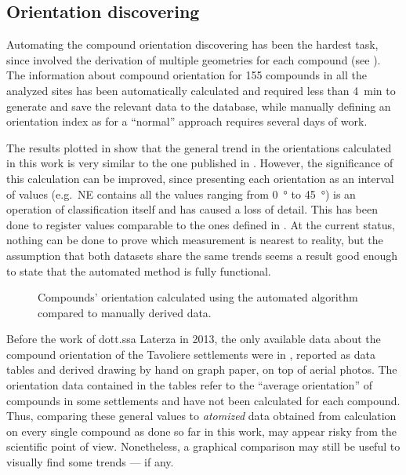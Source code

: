 
        \subsection{Orientation discovering}

            Automating the compound orientation discovering has been the hardest task, since involved the derivation of multiple geometries for each compound (see ).
            The information about compound orientation for 155 compounds in all the analyzed sites has been automatically calculated and required less than \SI{4}{\minute} to generate and save the relevant data to the database, while manually defining an orientation index as for a ``normal'' approach requires several days of work.
            
            The results plotted in  show that the general trend in the orientations calculated in this work is very similar to the one published in \cite{laterza}. However, the significance of this calculation can be improved, since presenting each orientation as an interval of values (e.g.\ NE contains all the values ranging from \SI{0}{\degree} to \SI{45}{\degree}) is an operation of classification itself and has caused a loss of detail. This has been done to register values comparable to the ones defined in \cite{laterza}. At the current status, nothing can be done to prove which measurement is nearest to reality, but the assumption that both datasets share the same trends seems a result good enough to state that the automated method is fully functional.

            \begin{figure}[H]
                \centering
                \begin{tikzpicture}
                    
                \end{tikzpicture}
                \caption[Orientation of compounds for all the settlements calculated in this work compared with know data.]{Compounds' orientation calculated using the automated algorithm compared to manually derived data.}
                \label{fig:graph-orient}
            \end{figure}

            Before the work of dott.ssa Laterza in 2013, the only available data about the compound orientation of the Tavoliere settlements were in \textcite[appx.~IV]{jones-tavoliere}, reported as data tables and derived drawing by hand on graph paper, on top of aerial photos. The orientation data contained in the tables refer to the ``average orientation'' of compounds in some settlements and have not been calculated for each compound. Thus, comparing these general values to \emph{atomized} data obtained from calculation on every single compound as done so far in this work, may appear risky from the scientific point of view. Nonetheless, a graphical comparison may still be useful to visually find some trends --- if any. 

